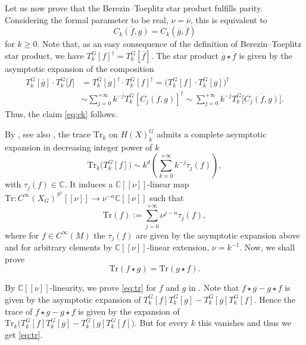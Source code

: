 \documentclass[10pt,a4paper]{amsart}
\numberwithin{equation}{section}
\begin{document}
 	Let us now prove that the Berezin--Toeplitz star product fulfills parity. Considering the formal parameter to be real, $\nu =\overline{\nu}$, this is equivalent to
 	\begin{equation} \label{eq:ck}
 		\overline{C_k(f, g)}=C_k(\overline{g}, \overline{f})
 	\end{equation}
 	for $k\geq 0$. Note that, as an easy consequence of the definition of Berezin--Toeplitz star product, we have
 	$T_k^G[f]^{\dagger}=T_k^G[\overline{f}]$.
 	The star product $\overline{g}\star\overline{f}$ is given by the asymptotic expansion of the composition
 	\begin{align*}
 		T_k^G[\overline{g}]\cdot T_k^G\big[\overline{f}\big]&=T_k^G[g]^{\dag}\cdot T_k^G[f]^{\dag} =\bigl(T_k^G[{f}]\cdot T_k^G[g]\bigr)^{\dag} \\
 		&\sim \sum_{j=0}^{+\infty} k^{-j} T_k^G[C_j(f, g)]^{\dag}
 		\sim \sum_{j=0}^{+\infty} k^{-j} T_k^G\big[\overline{C_j(f, g)}\big] .
 	\end{align*}
 	Thus, the claim \eqref{eq:ck} follows.
 	
 	By \cite{gh}, see also \cite{gh2}, the trace $\mathrm{Tr}_k$ on $H(X)^G_k$ admits a complete asymptotic expansion in decreasing integer power of $k$
 	\[\mathrm{Tr}_k\bigl(T^G_k[f] \bigr)\sim k^d\left(\sum_{k=0}^{+\infty} k^{-j} \tau_j(f)\right) ,\]
 	with $\tau_j(f)\in \mathbb{C}$. It induces a $\mathbb{C}[[\nu]]$-linear map
$\mathrm{Tr} \colon {C}^{\infty}(X_G)^{S^1}[[\nu]]\rightarrow \nu^{-n} \mathbb{C}[[\nu]]$
 	such that
 	\[\mathrm{Tr}(f):= \sum_{j=0}^{+\infty}\nu^{j-n} \tau_j(f) , \]
 	where for $f \in C^{\infty}(M)$ the $\tau_j(f)$ are given by the asymptotic expansion above and for arbitrary elements by $\mathbb{C}[[\nu]]$-linear extension, $\nu = k^{-1}$.
 	Now, we shall prove
 	\begin{equation} \label{eq:tr}
 		\mathrm{Tr}(f\star g)=\mathrm{Tr}(g\star f) .
 	\end{equation}
 	
 	By $\mathbb{C}[[\nu]]$-linearity, we prove \eqref{eq:tr} for $f$ and $g$ in . Note that $f\star g - g \star f$ is given by the asymptotic expansion of
 	$ T^G_k[f] T^G_k[g]- T^G_k[g] T^G_k[f]$.
 	Hence the trace of $f\star g - g \star f$ is given by the expansion of
 	$\mathrm{Tr}_k\bigl( T^G_k[f] T^G_k[g]- T^G_k[g] T^G_k[f] \bigr) $.
 	But for every $k$ this vanishes and thus we get \eqref{eq:tr}.
\end{document}
